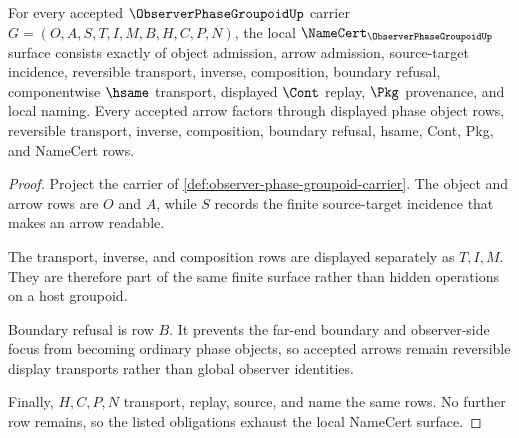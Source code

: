 \begin{theorem}
\label{thm:observer-phase-groupoid-namecert-obligations}
For every accepted $\ObserverPhaseGroupoidUp$ carrier $G=(O,A,S,T,I,M,B,H,C,P,N)$, the local $\NameCert_{\ObserverPhaseGroupoidUp}$ surface consists exactly of object admission, arrow admission, source-target incidence, reversible transport, inverse, composition, boundary refusal, componentwise $\hsame$ transport, displayed $\Cont$ replay, $\Pkg$ provenance, and local naming. Every accepted arrow factors through displayed phase object rows, reversible transport, inverse, composition, boundary refusal, hsame, Cont, Pkg, and NameCert rows.
\end{theorem}
\begin{proof}
Project the carrier of \autoref{def:observer-phase-groupoid-carrier}. The object and arrow rows are $O$ and $A$, while $S$ records the finite source-target incidence that makes an arrow readable.

The transport, inverse, and composition rows are displayed separately as $T,I,M$. They are therefore part of the same finite surface rather than hidden operations on a host groupoid.

Boundary refusal is row $B$. It prevents the far-end boundary and observer-side focus from becoming ordinary phase objects, so accepted arrows remain reversible display transports rather than global observer identities.

Finally, $H,C,P,N$ transport, replay, source, and name the same rows. No further row remains, so the listed obligations exhaust the local NameCert surface.
\end{proof}

